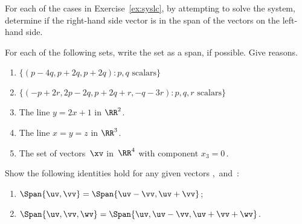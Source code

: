 \begin{exercise} \label{ex:} 
For each of the cases in Exercise~\ref{ex:syslc}, by attempting to solve the system, determine if the right-hand side vector is in the span of the vectors on the left-hand side.
\end{exercise}




\begin{exercise} \label{ex:} 
For each of the following sets, write the set as a span, if possible.
Give reasons.
\begin{enumerate}
\item \(\{(p-4q,p+2q,p+2q): p,q\text{ scalars}\}\)

\item \(\{(-p+2r,2p-2q,p+2q+r,-q-3r): p,q,r\text{ scalars}\}\)

\item The line \(y=2x+1\) in \(\RR^2\).

\item The line \(x=y=z\) in \(\RR^3\).

\item The set of vectors~\(\xv\) in~\(\RR^4\) with component \(x_3=0\)\,.
\end{enumerate}
\end{exercise}







\begin{exercise} \label{ex:} 
Show the following identities hold for any given vectors \uv,\vv\ and~\wv:
\begin{enumerate}
\item \(\Span\{\uv,\vv\}=\Span\{\uv-\vv,\uv+\vv\}\);
\item \(\Span\{\uv,\vv,\wv\}=\Span\{\uv,\uv-\vv,\uv+\vv+\wv\}\).
\end{enumerate}
\end{exercise}








